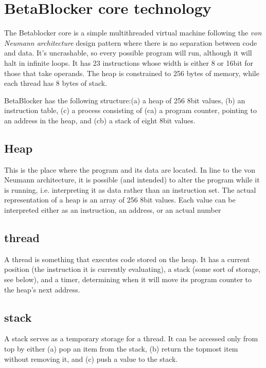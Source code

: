 \documentclass[letterpaper, 12pt]{article}
\begin{document}
\parskip 18pt

\section{BetaBlocker core technology} 
\label{sec:betablocker_core}


The Betablocker core is a simple multithreaded virtual machine following the \emph{von Neumann architecture} design pattern where there is no separation between code and data.
It's uncrashable, so every possible program will run, although it will halt in infinite loops. 
It has 23 instructions whose width is either 8 or 16bit for those that take operands. The heap is constrained to 256 bytes of memory, while each thread has 8 bytes of stack. 


BetaBlocker has the following structure:(a) a heap of 256 8bit values, (b) an instruction table, (c) a process consisting of (ca) a program counter, pointing to an address in the heap, and (cb) a stack of eight 8bit values.

\subsection{Heap} 
\label{sub:heap}
This is the place where the program and its data are located. In line to the von Neumann architecture, it is possible (and intended) to alter the program while it is running, i.e. interpreting it as data rather than an instruction set. The actual representation of a heap is an array of 256 8bit values. Each value can be interpreted either as an instruction, an address, or an actual number


\subsection{thread} 
\label{sub:thread}
A thread is something that executes code stored on the heap. It has a current position (the instruction it is currently evaluating), a stack (some sort of storage, see below), and a timer, determining when it will move its program counter to the heap's next address.

\subsection{stack} 
\label{sub:stack}
A stack serves as a temporary storage for a thread. It can be accessed only from top by either (a) pop an item from the stack, (b) return the topmost item without removing it, and (c) push a value to the stack.
\end{document}

